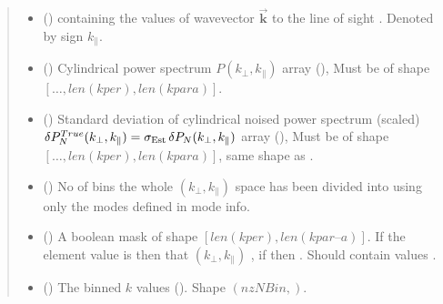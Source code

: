 \documentclass[a4paper,11pt,oneside,english,openany]{sphinxmanual}
\begin{document}
\begin{fulllineitems}
\begin{quote}
\begin{description}
\begin{itemize}
\item {} 
\sphinxAtStartPar
{} () \textendash{}  containing the values of wave\sphinxhyphen{}vector \(\vec{\mathbf{k}}\)  to the line of sight . Denoted by sign \(k_{\parallel}\).

\item {} 
\sphinxAtStartPar
{} () \textendash{} Cylindrical power spectrum \(P(k_{\perp},k_{\parallel})\) array (), Must be of shape \([\dots,len(kper),len(kpara)]\).

\item {} 
\sphinxAtStartPar
{} () \textendash{} Standard deviation of cylindrical noised power spectrum (scaled) \(\delta P_N^{True}(k_{\perp},k_{\parallel}) = \sigma_{\rm Est}\,\delta P_N(k_{\perp},k_{\parallel})\) array (), Must be of shape \([\dots,len(kper),len(kpara)]\), same shape as .

\item {} 
\sphinxAtStartPar
{} () \textendash{} No of bins the whole \((k_{\perp},k_{\parallel})\) space has been divided into using only the modes defined in  mode info.

\item {} 
\sphinxAtStartPar
{} () \textendash{} A  boolean mask of shape \([len(kper),len(kpar–a)]\). If the element value is  then that \((k_{\perp},k_{\parallel})\) , if  then . Should contain values .

\end{itemize}

\sphinxAtStartPar
\begin{itemize}
\item {} 
\sphinxAtStartPar
{} () \textendash{} The binned \(k\) values (). Shape \(({nzN\!Bin},)\).


\end{itemize}
\end{description}
\end{quote}
\end{fulllineitems}
\end{document}
